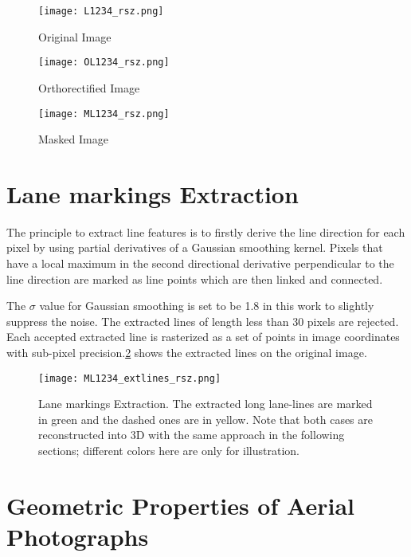 \begin{figure}%
  \parbox{.45\linewidth}{
    \centering
    \texttt{[image: L1234\_rsz.png]}
    \caption{Original Image}
    \label{fig:OriImg}
  }
  \hfill
  \parbox{.45\linewidth}{
    \centering
    \texttt{[image: OL1234\_rsz.png]}
    \caption{Orthorectified Image}
    \label{fig:OrthoImg}
  }
    \centering
    \texttt{[image: ML1234\_rsz.png]}
    \caption{Masked Image}
    \label{fig:MaskedImg}
\end{figure}

\clearpage

\section{Lane markings Extraction}
\label{sec:LineExtraction}

The principle to extract line features is to firstly derive the line direction for each pixel by using partial derivatives of a Gaussian smoothing kernel. Pixels that have a local maximum in the second directional derivative perpendicular to the line direction are marked as line points which are then linked and connected.

The $\sigma$ value for Gaussian smoothing is set to be 1.8 in this work to slightly suppress the noise. The extracted lines of length less than 30 pixels are rejected. Each accepted extracted line is rasterized as a set of points in image coordinates with sub-pixel precision.\cref{fig:LineExtraction} shows the extracted lines on the original image.
\begin{figure}
  \centering
  \texttt{[image: ML1234\_extlines\_rsz.png]}
  \caption{Lane markings Extraction. The extracted long lane-lines are marked in green and the dashed ones are in yellow.  Note that both cases are reconstructed into 3D with the same approach in the following sections; different colors here are only for illustration.}
  \label{fig:LineExtraction}
\end{figure}

\section{Geometric Properties of Aerial Photographs}
\label{sec:Geometry}

